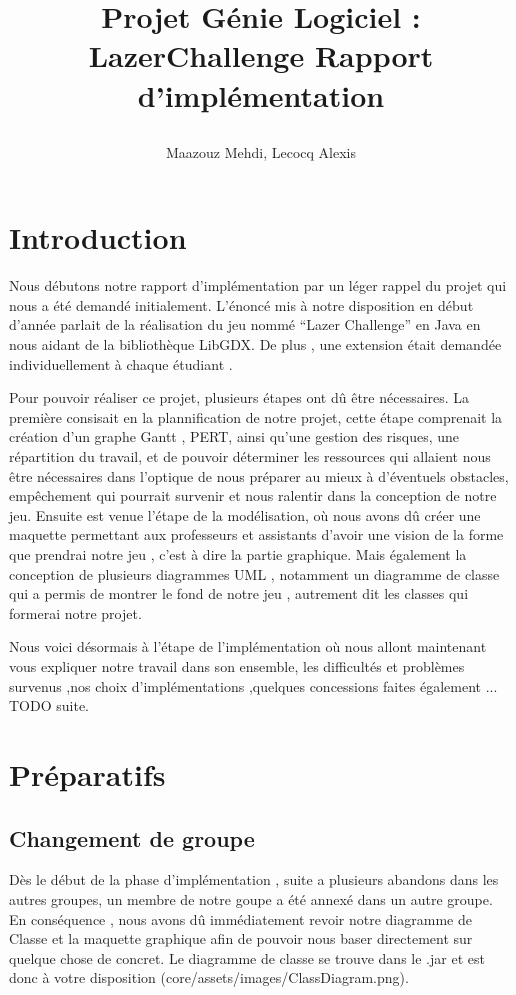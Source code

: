 \documentclass[a4paper,10pt]{article}
\title{
    \begin{minipage}\linewidth
        \centering\bfseries\sffamily
        Projet Génie Logiciel : LazerChallenge
        \vskip3pt
        \large Rapport d'implémentation
    \end{minipage}
    }
\author{Maazouz Mehdi, Lecocq Alexis}
\begin{document}
\maketitle
\tableofcontents
\newpage
\section{Introduction}
Nous débutons notre rapport d'implémentation par un léger rappel du projet qui nous a été demandé initialement. 
L'énoncé mis à notre disposition en début d'année parlait de la réalisation du jeu nommé ``Lazer Challenge'' en Java
en nous aidant de la bibliothèque LibGDX. De plus , une extension était demandée individuellement à chaque étudiant .

Pour pouvoir réaliser ce projet, plusieurs étapes ont dû être nécessaires. La première consisait en la plannification de notre projet,
 cette étape comprenait la création d'un graphe Gantt , PERT, ainsi qu'une gestion des risques, une répartition du travail,
 et de pouvoir déterminer les ressources qui allaient nous être nécessaires dans l'optique de nous préparer au mieux à d'éventuels
 obstacles, empêchement qui pourrait survenir et nous ralentir dans la conception de notre jeu. Ensuite est venue l'étape de la modélisation, où nous
 avons dû créer une maquette permettant aux professeurs et assistants d'avoir une vision de la forme que prendrai notre jeu , c'est à dire la partie graphique.
 Mais également la conception de plusieurs diagrammes UML , notamment un diagramme de classe qui a permis de montrer le fond de notre jeu , autrement dit les classes
 qui formerai notre projet.
 
 Nous voici désormais à l'étape de l'implémentation où nous allont maintenant vous expliquer notre travail dans son ensemble,
 les difficultés et problèmes survenus ,nos choix d'implémentations ,quelques concessions faites également ... TODO suite.
\section{Préparatifs}
\subsection{Changement de groupe}
Dès le début de la phase d'implémentation , suite a plusieurs abandons dans les autres groupes, un membre de notre goupe a été annexé dans un autre groupe.
En conséquence , nous avons dû immédiatement revoir notre diagramme de Classe et la maquette graphique afin de pouvoir nous baser directement sur quelque chose
de concret. Le diagramme de classe se trouve dans le .jar et est donc à votre disposition (core/assets/images/ClassDiagram.png).
\end{document}
